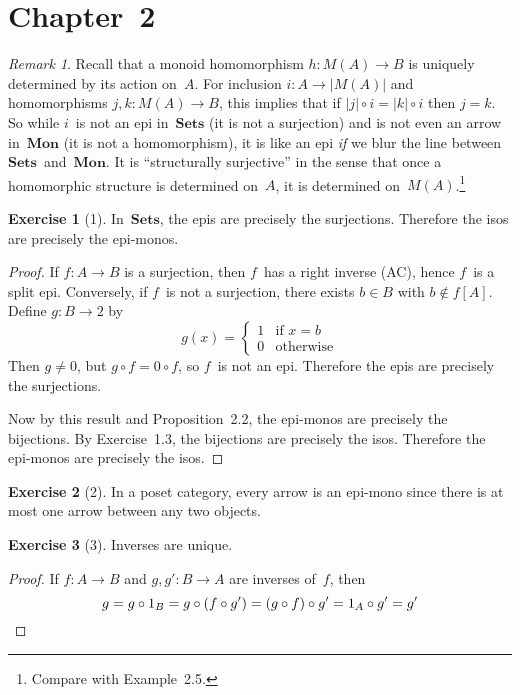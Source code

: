 \documentclass[letterpaper,12pt]{article}
\newcommand{\after}{\circ}
\newcommand{\cat}[1]{\mathbf{#1}}
\newcommand{\under}[1]{|{#1}|}
\newcommand{\Sets}{\cat{Sets}}
\newcommand{\Mon}{\cat{Mon}}
\theoremstyle{definition}
\newtheorem*{exer}{Exercise}
\theoremstyle{remark}
\newtheorem*{rmk}{Remark}
\theoremstyle{direction}
\begin{document}
\section*{Chapter~2}
\begin{rmk}
Recall that a monoid homomorphism \(h:M(A)\to B\) is uniquely determined by its action on~\(A\). For inclusion \(i:A\to\under{M(A)}\) and homomorphisms \(j,k:M(A)\to B\), this implies that if \(\under{j}\after i=\under{k}\after i\) then \(j=k\). So while \(i\)~is not an epi in~\(\Sets\) (it is not a surjection) and is not even an arrow in~\(\Mon\) (it is not a homomorphism), it is like an epi \emph{if} we blur the line between \(\Sets\)~and~\(\Mon\). It is ``structurally surjective'' in the sense that once a homomorphic structure is determined on~\(A\), it is determined on~\(M(A)\).\footnote{Compare with Example~2.5.}
\end{rmk}

\begin{exer}[1]
In~\(\Sets\), the epis are precisely the surjections. Therefore the isos are precisely the epi-monos.
\end{exer}
\begin{proof}
If \(f:A\to B\) is a surjection, then \(f\)~has a right inverse (AC), hence \(f\)~is a split epi. Conversely, if \(f\)~is not a surjection, there exists \(b\in B\) with \(b\not\in f[A]\). Define \(g:B\to 2\) by
\[g(x)=\begin{cases}
1&\text{if }x=b\\
0&\text{otherwise}
\end{cases}\]
Then \(g\ne0\), but \(g\after f=0\after f\), so \(f\)~is not an epi. Therefore the epis are precisely the surjections.

Now by this result and Proposition~2.2, the epi-monos are precisely the bijections. By Exercise~1.3, the bijections are precisely the isos. Therefore the epi-monos are precisely the isos.
\end{proof}

\begin{exer}[2]
In a poset category, every arrow is an epi-mono since there is at most one arrow between any two objects.
\end{exer}

\begin{exer}[3]
Inverses are unique.
\end{exer}
\begin{proof}
If \(f:A\to B\) and \(g,g':B\to A\) are inverses of~\(f\), then
\[g=g\after 1_B=g\after(f\after g')=(g\after f)\after g'=1_A\after g'=g'\qedhere\]
\end{proof}
\end{document}
